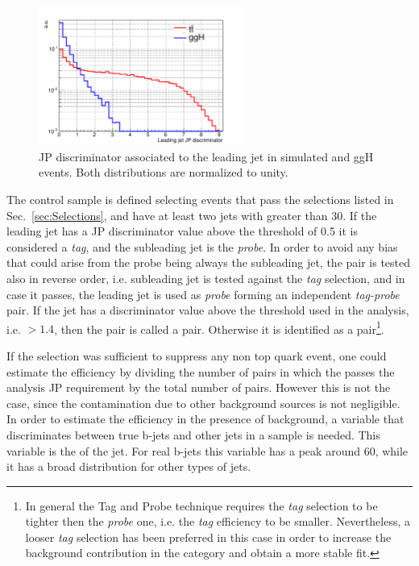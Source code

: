 \begin{figure}[htb]
\centering
\includegraphics[width=0.6\textwidth]{images/JPdiscr.pdf}
\caption{JP discriminator associated to the leading jet in simulated \ttbar and ggH events. Both distributions are normalized to unity.\label{fig:JPdiscr}}
\end{figure}

The control sample is defined selecting events that pass the selections listed in Sec.~\ref{sec:Selections}, and have at least two jets with \pt greater than 30\GeV. If the leading jet has a JP discriminator value above the threshold of 0.5 it is considered a \emph{tag}, and the subleading jet is the \emph{probe}. In order to avoid any bias that could arise from the probe being always the subleading jet, the pair is tested also in reverse order, i.e. subleading jet is tested against the \emph{tag} selection, and in case it passes, the leading jet is used as \emph{probe} forming an independent \emph{tag-probe} pair. If the \probe jet has a discriminator value above the threshold used in the analysis, i.e. $>1.4$, then the \tp pair is called a \tpp pair. Otherwise it is identified as a \tfp pair\footnote{In general the Tag and Probe technique requires the \emph{tag} selection to be tighter then the \emph{probe} one, i.e. the \emph{tag} efficiency to be smaller. Nevertheless, a looser \emph{tag} selection has been preferred in this case in order to increase the background contribution in the \tpp category and obtain a more stable fit.}.

If the \tg selection was sufficient to suppress any non top quark event, one could estimate the efficiency by dividing the number of \tp pairs in which the \probe passes the analysis JP requirement by the total number of \tp pairs. However this is not the case, since the contamination due to other background sources is not negligible. In order to estimate the efficiency in the presence of background, a variable that discriminates between true b-jets and other jets in a \ttbar sample is needed. This variable is the \pt of the \probe jet. For real b-jets this variable has a peak around 60\GeV, while it has a broad distribution for other types of jets.

